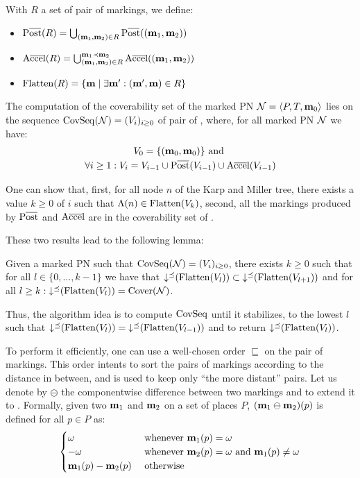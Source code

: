 With $R$ a set of pair of markings, we define:
\begin{itemize}
  \item $\Postb(R) = \bigcup_{(\mar_1, \mar_2) \in R} \Postb((\mar_1, \mar_2))$
  \item $\operatorname{A\overline{cce}l}(R) = \bigcup_{(\mathbf{m}_1, \mathbf{m}_2) \in R}^{\mathbf{m}_1 \prec \mathbf{m}_2} \operatorname{A\overline{cce}l}((\mathbf{m}_1, \mathbf{m}_2))$
  \item $\operatorname{Flatten}(R) = \{\mathbf{m} \mid \exists \mathbf{m'} : (\mathbf{m'}, \mathbf{m}) \in R\}$
\end{itemize}

The computation of the coverability set of the marked \ac{PN} $\mathcal{N} = \langle P,T, \mathbf{m}_0\rangle$ lies on the sequence $\operatorname{CovSeq}(\mathcal{N}) = (V_i)_{i \geq 0}$ of pair of \omarks, where, for all marked \ac{PN} $\mathcal{N}$ we have:
\begin{gather*}
  V_0 = \{(\mari, \mari)\} \text{ and } \\
  \forall i \geq 1 : V_i = V_{i-1} \cup \Postb(V_{i-1}) \cup \Accelb(V_{i-1})
\end{gather*}

One can show that,
first, for all node $n$ of the Karp and Miller tree, there exists a value $k \geq 0$ of $i$ such that $\Lambda(n) \in \operatorname{Flatten}(V_k)$,
second, all the markings produced by $\Postb$ and $\operatorname{A\overline{cce}l}$ are in the coverability set of \N.

These two results lead to the following lemma:
\begin{lemm}
  Given a marked \ac{PN} \N such that $\operatorname{CovSeq}(\mathcal{N}) = (V_i)_{i \geq 0}$,
  there exists $k \geq 0$ such that for all $l \in \{0, ..., k-1\}$ we have that $\operatorname{\downarrow^\preceq}(\operatorname{Flatten}(V_l)) \subset \operatorname{\downarrow^\preceq}(\operatorname{Flatten}(V_{l+1}))$
  and for all $l \geq k : \operatorname{\downarrow^\preceq}(\operatorname{Flatten}(V_l)) = \operatorname{Cover}(\mathcal{N})$.
\end{lemm}

Thus, the algorithm idea is to compute $\operatorname{CovSeq}$ until it stabilizes,  to the lowest $l$ such that $\operatorname{\downarrow^\preceq}(\operatorname{Flatten}(V_l)) = \operatorname{\downarrow^\preceq}(\operatorname{Flatten}(V_{l-1}))$ and to return $\operatorname{\downarrow^\preceq}(\operatorname{Flatten}(V_l))$.

To perform it efficiently, one can use a well-chosen order $\sqsubseteq$ on the pair of markings.
This order intents to sort the pairs of markings according to the distance in between, and is used to keep only ``the more distant'' pairs.
Let us denote by $\ominus$ the componentwise difference between two markings and to extend it to \omarks.
Formally, given two \omarks $\mathbf{m}_1$ and $\mathbf{m}_2$ on a set of places $P$, $(\mathbf{m}_1 \ominus \mathbf{m}_2)(p)$ is defined for all $p \in P$ as:
\[
  \begin{cases}
    \omega & \text{ whenever } \mathbf{m}_1(p) = \omega \\
    -\omega & \text{ whenever } \mathbf{m}_2(p) = \omega \text{ and } \mathbf{m}_1(p) \neq \omega \\
    \mathbf{m}_1(p) - \mathbf{m}_2(p) & \text{ otherwise}
  \end{cases}
\]

